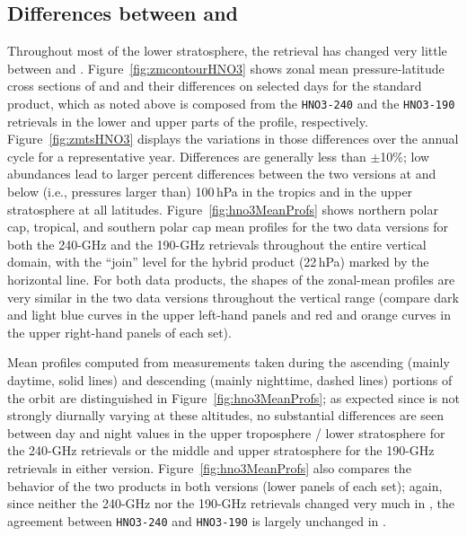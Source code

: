 \subsection{Differences between \prevv and \thisv}

Throughout most of the lower stratosphere, the  retrieval has changed very little between \prevv and \thisv. Figure~\ref{fig:zmcontourHNO3} shows zonal mean pressure-latitude cross sections of \thisv and \prevv and their differences on selected days for the standard  product, which as noted above is composed from the \texttt{HNO3-240} and the \texttt{HNO3-190} retrievals in the lower and upper parts of the profile, respectively. Figure~\ref{fig:zmtsHNO3} displays the variations in those differences over the annual cycle for a representative year. Differences are generally less than $\pm$10\%; low  abundances lead to larger percent differences between the two versions at and below (i.e., pressures larger than) 100\,hPa in the tropics and in the upper stratosphere at all latitudes. Figure~\ref{fig:hno3MeanProfs} shows northern polar cap, tropical, and southern polar cap mean profiles for the two data versions for both the \mbox{240\nobreakdash-GHz} and the \mbox{190\nobreakdash-GHz} retrievals  throughout the entire vertical domain, with the ``join'' level for the hybrid product (22\,hPa) marked by the horizontal line. For both  data products, the shapes of the zonal-mean profiles are very similar in the two data versions throughout the vertical range (compare dark and light blue curves in the upper left-hand panels and red and orange curves in the upper right-hand panels of each set).

Mean profiles computed from measurements taken during the ascending (mainly daytime, solid lines) and descending (mainly nighttime, dashed lines) portions of the orbit are distinguished in Figure~\ref{fig:hno3MeanProfs}; as expected since  is not strongly diurnally varying at these altitudes, no substantial differences are seen between day and night values in the upper troposphere / lower stratosphere for the \mbox{240\nobreakdash-GHz} retrievals or the middle and upper stratosphere for the \mbox{190\nobreakdash-GHz} retrievals in either version. Figure~\ref{fig:hno3MeanProfs} also compares the behavior of the two  products in both versions (lower panels of each set); again, since neither the \mbox{240\nobreakdash-GHz} nor the \mbox{190\nobreakdash-GHz} retrievals changed very much in \thisv, the agreement between \texttt{HNO3-240} and \texttt{HNO3-190} is largely unchanged in \thisv.


